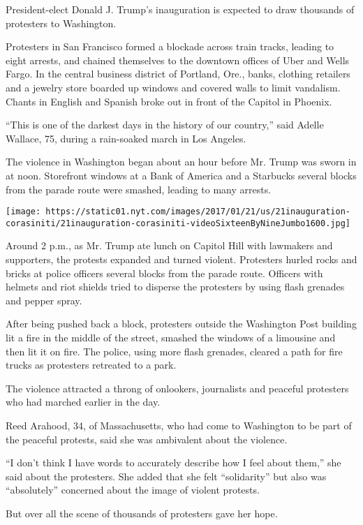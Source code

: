President-elect Donald J. Trump's inauguration is expected to draw
thousands of protesters to Washington.

Protesters in San Francisco formed a blockade across train tracks,
leading to eight arrests, and chained themselves to the downtown offices
of Uber and Wells Fargo. In the central business district of Portland,
Ore., banks, clothing retailers and a jewelry store boarded up windows
and covered walls to limit vandalism. Chants in English and Spanish
broke out in front of the Capitol in Phoenix.

``This is one of the darkest days in the history of our country,'' said
Adelle Wallace, 75, during a rain-soaked march in Los Angeles.

The violence in Washington began about an hour before Mr. Trump was
sworn in at noon. Storefront windows at a Bank of America and a
Starbucks several blocks from the parade route were smashed, leading to
many arrests.

\texttt{[image: https://static01.nyt.com/images/2017/01/21/us/21inauguration-corasiniti/21inauguration-corasiniti-videoSixteenByNineJumbo1600.jpg]}

Around 2 p.m., as Mr. Trump ate lunch on Capitol Hill with lawmakers and
supporters, the protests expanded and turned violent. Protesters hurled
rocks and bricks at police officers several blocks from the parade
route. Officers with helmets and riot shields tried to disperse the
protesters by using flash grenades and pepper spray.

After being pushed back a block, protesters outside the Washington Post
building lit a fire in the middle of the street, smashed the windows of
a limousine and then lit it on fire. The police, using more flash
grenades, cleared a path for fire trucks as protesters retreated to a
park.

The violence attracted a throng of onlookers, journalists and peaceful
protesters who had marched earlier in the day.

Reed Arahood, 34, of Massachusetts, who had come to Washington to be
part of the peaceful protests, said she was ambivalent about the
violence.

``I don't think I have words to accurately describe how I feel about
them,'' she said about the protesters. She added that she felt
``solidarity'' but also was ``absolutely'' concerned about the image of
violent protests.

But over all the scene of thousands of protesters gave her hope.

